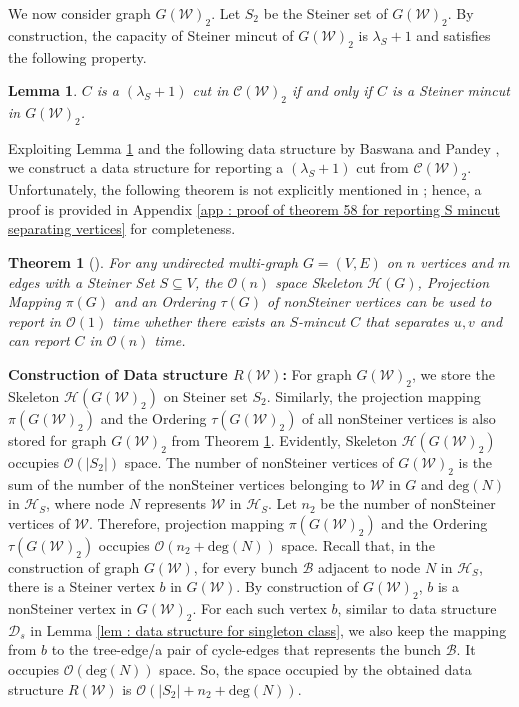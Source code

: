 \documentclass[letterpaper,11pt]{article}
\newtheorem{theorem}{Theorem}[]
\newtheorem{lemma}{Lemma}[]
\begin{document}
We now consider graph $G({\mathcal W})_2$. Let $S_2$ be the Steiner set of $G({\mathcal W})_2$. By construction, the capacity of Steiner mincut of $G({\mathcal W})_2$ is $\lambda_S+1$ and satisfies the following property.
\begin{lemma} \label{lem : all cuts GW2}
    $C$ is a $(\lambda_S+1)$ cut in ${\mathcal C}({\mathcal W})_2$ if and only if $C$ is a Steiner mincut in $G({\mathcal W})_2$.
\end{lemma}
Exploiting Lemma \ref{lem : all cuts GW2} and the following data structure by Baswana and Pandey \cite{DBLP:conf/soda/BaswanaP22}, we construct a data structure for reporting a $(\lambda_S+1)$ cut from ${\mathcal C}({\mathcal W})_2$. Unfortunately, the following theorem is not explicitly mentioned in \cite{DBLP:conf/soda/BaswanaP22}; hence, a proof is provided in Appendix \ref{app : proof of theorem 58 for reporting S mincut separating vertices} for completeness.
\begin{theorem} [\cite{DBLP:conf/soda/BaswanaP22}] \label{thm : reporting $S$-mincut using skeleton and projection mapping}
    For any undirected multi-graph $G=(V,E)$ on $n$ vertices and $m$ edges with a Steiner Set $S\subseteq V$, the ${\mathcal O}(n)$ space Skeleton ${\mathcal H}(G)$, Projection Mapping $\pi(G)$ and an Ordering $\tau(G)$ of nonSteiner vertices can be used to report in ${\mathcal O}(1)$ time whether there exists an $S$-mincut $C$ that separates $u,v$ and can report $C$ in ${\mathcal O}(n)$ time.
\end{theorem}

\noindent
\textbf{Construction of Data structure $R({\mathcal W})$:} For graph $G({\mathcal W})_2$, we store the Skeleton ${\mathcal H}({G({\mathcal W})_2})$ on Steiner set $S_2$. Similarly, the projection mapping $\pi({G({\mathcal W})_2})$ and the Ordering $\tau({G({\mathcal W})_2})$ of all nonSteiner vertices is also stored for graph ${G({\mathcal W})_2}$ from Theorem \ref{thm : reporting $S$-mincut using skeleton and projection mapping}. Evidently, Skeleton ${\mathcal H}({G({\mathcal W})_2})$ occupies ${\mathcal O}(|S_2|)$ space. The number of nonSteiner vertices of $G({\mathcal W})_2$ is the sum of the number of the nonSteiner vertices belonging to ${\mathcal W}$ in $G$ and $\text{deg}(N)$ in ${\mathcal H}_S$, where node $N$ represents ${\mathcal W}$ in ${\mathcal H}_S$. Let $n_2$ be the number of nonSteiner vertices of ${\mathcal W}$. Therefore, projection mapping $\pi({G({\mathcal W})_2})$ and the Ordering $\tau({G({\mathcal W})_2})$ occupies ${\mathcal O}(n_2+\text{deg}(N))$ space. Recall that, in the construction of graph $G({\mathcal W})$, for every bunch ${\mathcal B}$ adjacent to node $N$ in ${\mathcal H}_S$, there is a Steiner vertex $b$ in $G({\mathcal W})$. By construction of $G({\mathcal W})_2$, $b$ is a nonSteiner vertex in $G({\mathcal W})_2$. For each such vertex $b$, similar to data structure ${\mathcal D}_s$ in Lemma \ref{lem : data structure for singleton class}, we also keep the mapping from $b$ to the tree-edge/a pair of cycle-edges that represents the bunch ${\mathcal B}$. It occupies ${\mathcal O}(\text{deg}(N))$ space. So, the space occupied by the obtained data structure $R({\mathcal W})$ is ${\mathcal O}(|S_2|+n_2+\text{deg}(N))$.  
\end{document}
